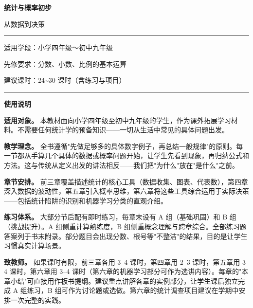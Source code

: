 \documentclass[a4paper,12pt]{ctexart}
\begin{document}
\pagestyle{empty}

\vspace*{2.5cm}
{\centering
  {\Huge\bfseries\color{mainblue} 统计与概率初步}\par
  \vspace{0.6cm}
  {\Large 从数据到决策}\par
  \vspace{2cm}
  \rule{0.5\textwidth}{0.4pt}\par
  \vspace{1.2cm}
  {\normalsize 适用学段：小学四年级～初中九年级}\par
  \vspace{0.4cm}
  {\normalsize 先修要求：分数、小数、比例的基本运算}\par
  \vspace{0.4cm}
  {\normalsize 建议课时：24\~{}30 课时（含练习与项目）}\par
  \vspace{1.2cm}
  \rule{0.5\textwidth}{0.4pt}
}
\newpage

\vspace*{0.5cm}
{\Large\bfseries\color{mainblue} 使用说明}\par
\vspace{0.3cm}

\textbf{适用对象。} 本教材面向小学四年级至初中九年级的学生，作为课外拓展学习材料。不需要任何统计学的预备知识——一切从生活中常见的具体问题出发。

\textbf{教学理念。} 全书遵循"先做足够多的具体数字例子，再总结一般规律"的原则。每一节都从手算几个具体的数据或概率问题开始，让学生先看到现象，再归纳公式和方法。这与传统从定义出发的讲法相反——我们把"为什么"放在"是什么"之前。

\textbf{章节安排。} 前三章覆盖描述统计的核心工具（数据收集、图表、代表数），第四章深入数据的波动性，第五章引入概率思维，第六章将这些工具综合运用于实际决策——包括统计陷阱的识别和机器学习分类的直观介绍。

\textbf{练习体系。} 大部分节后配有即时练习，每章末设有 A 组（基础巩固）和 B 组（挑战提升）。A 组侧重计算熟练度，B 组侧重概念理解与跨章综合。全部练习题答案列于书末附录。部分题目会出现分数、根号等"不整洁"的结果，目的是让学生习惯真实计算场景。

\textbf{致教师。} 如果课时有限，前三章各用 3--4 课时，第四章用 2--3 课时，第五章用 3--4 课时，第六章用 3--4 课时（第六章的机器学习部分可作为选讲内容）。每章的"本章小结"可直接用作板书提纲。建议重点讲解各章的实例部分，让学生课后独立完成 A 组练习，B 组可作为讨论题或选做。第六章的统计调查项目建议在学期中安排一次完整的实践。
\end{document}
